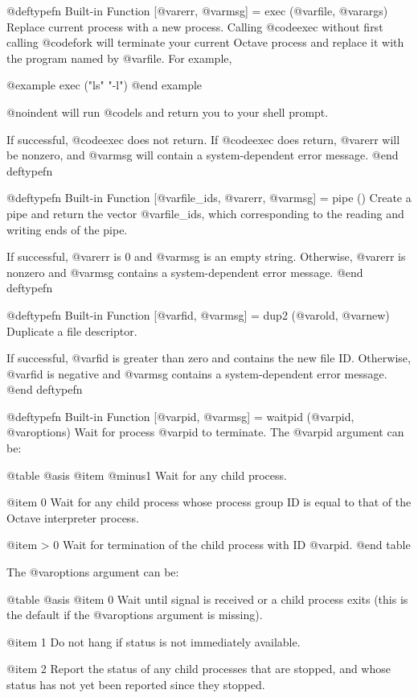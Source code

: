 {{@deftypefn {Built-in Function} {[@var{err}, @var{msg}] =} exec (@var{file}, @var{args})
Replace current process with a new process.  Calling @code{exec} without
first calling @code{fork} will terminate your current Octave process and
replace it with the program named by @var{file}.  For example,

@example
exec ("ls" "-l")
@end example

@noindent
will run @code{ls} and return you to your shell prompt.

If successful, @code{exec} does not return.  If @code{exec} does return,
@var{err} will be nonzero, and @var{msg} will contain a system-dependent
error message.
@end deftypefn

@deftypefn {Built-in Function} {[@var{file_ids}, @var{err}, @var{msg}] =} pipe ()
Create a pipe and return the vector @var{file_ids}, which corresponding
to the reading and writing ends of the pipe.

If successful, @var{err} is 0 and @var{msg} is an empty string.
Otherwise, @var{err} is nonzero and @var{msg} contains a
system-dependent error message.
@end deftypefn

@deftypefn {Built-in Function} {[@var{fid}, @var{msg}] =} dup2 (@var{old}, @var{new})
Duplicate a file descriptor.

If successful, @var{fid} is greater than zero and contains the new file
ID.  Otherwise, @var{fid} is negative and @var{msg} contains a
system-dependent error message.
@end deftypefn

@deftypefn {Built-in Function} {[@var{pid}, @var{msg}] =} waitpid (@var{pid}, @var{options})
Wait for process @var{pid} to terminate.  The @var{pid} argument can be:

@table @asis
@item @minus{}1
Wait for any child process.

@item 0
Wait for any child process whose process group ID is equal to that of
the Octave interpreter process.

@item > 0
Wait for termination of the child process with ID @var{pid}.
@end table

The @var{options} argument can be:

@table @asis
@item 0
Wait until signal is received or a child process exits (this is the
default if the @var{options} argument is missing).

@item 1
Do not hang if status is not immediately available.

@item 2
Report the status of any child processes that are stopped, and whose
status has not yet been reported since they stopped.

}}
